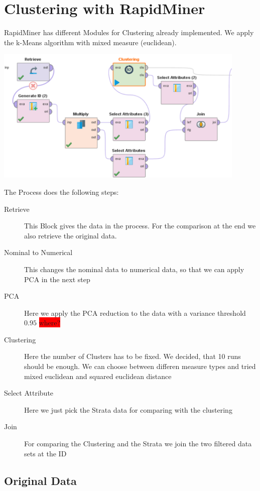 
\section{Clustering with RapidMiner}

RapidMiner has different Modules for Clustering already implemented. We apply the k-Means algorithm with mixed measure (euclidean).

\includegraphics[width=0.9\textwidth]{ClusteringRapid.PNG}


The Process does the following steps:
\begin{description}
	\item[Retrieve] This Block gives the data in the process. For the comparison at the end we also retrieve the original data.
	\item[Nominal to Numerical] This changes the nominal data to numerical data, so that we can apply PCA in the next step
	\item[PCA] Here we apply the PCA reduction to the data with a variance threshold $0.95$ \colorbox{red}{where?}
	\item[Clustering] Here the number of Clusters has to be fixed. We decided, that 10 runs should be enough. We can choose between differen measure types and tried mixed euclidean and squared euclidean distance
	\item[Select Attribute] Here we just pick the Strata data for comparing with the clustering
	\item[Join] For comparing the Clustering and the Strata we join the two filtered data sets at the ID
\end{description}

\subsection{Original Data}

